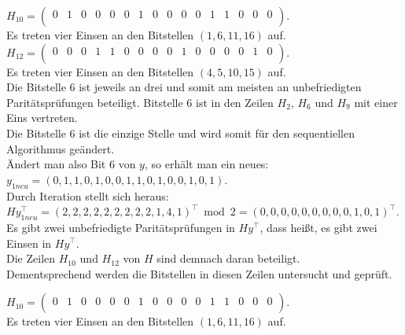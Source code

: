 \begin{Beispiel}
    $H_{10}= \left( \begin{array}{rrrrrrrrrrrrrrrr}
        0 & 1 & 0 & 0 & 0 & 0 & 1 & 0 & 0 & 0 & 0 & 1 & 1 & 0 & 0 & 0 \\
       \end{array}\right). 
    $\\
    Es treten vier Einsen an den Bitstellen $(1, 6, 11, 16)$ auf.\\
    
    $H_{12}= \left( \begin{array}{rrrrrrrrrrrrrrrr}
        0 & 0 & 0 & 1 & 1 & 0 & 0 & 0 & 0 & 1 & 0 & 0 & 0 & 0 & 1 & 0 \\
       \end{array}\right). 
    $\\
    Es treten vier Einsen an den Bitstellen $(4, 5, 10, 15)$ auf.\\
    
    Die Bitstelle $6$ ist jeweils an drei und somit am meisten an unbefriedigten Paritätsprüfungen beteiligt.
    Bitstelle $6$ ist in den Zeilen $H_2$, $H_6$ und $H_9$ mit einer Eins vertreten.\\
    Die Bitstelle $6$ ist die einzige Stelle und wird somit für den sequentiellen Algorithmus geändert.\\
    
    Ändert man also Bit $6$ von $y$, so erhält man ein neues:\\
    $y_{1neu} = (0,1,1,0,1,0,0,1,1,0,1,0,0,1,0,1).$\\
    
    Durch Iteration stellt sich heraus:\\
    $Hy_{1neu}^\intercal = (2,2,2,2,2,2,2,2,2,1,4,1)^\intercal \bmod 2 =(0,0,0,0,0,0,0,0,0,1,0,1)^\intercal.$\\
    
    Es gibt zwei unbefriedigte Paritätsprüfungen in $Hy^\intercal$, dass hei\ss{}t, es gibt zwei Einsen in $Hy^\intercal.$\\
    Die Zeilen $H_{10}$ und $H_{12}$ von $H$ sind demnach daran beteiligt.\\ 
    Dementsprechend werden die Bitstellen in diesen Zeilen untersucht und geprüft.\\
    \pagebreak
    
    $H_{10}= \left( \begin{array}{rrrrrrrrrrrrrrrr}
        0 & 1 & 0 & 0 & 0 & 0 & 1 & 0 & 0 & 0 & 0 & 1 & 1 & 0 & 0 & 0 \\
       \end{array}\right). 
    $\\
    Es treten vier Einsen an den Bitstellen $(1, 6, 11, 16)$ auf.\\
    

\end{Beispiel}
